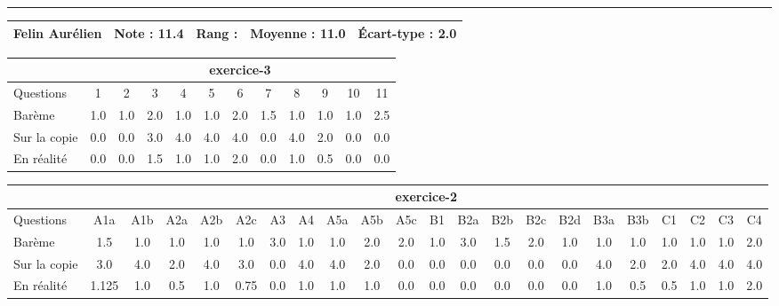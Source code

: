\documentclass[a4paper, landscape, 10pt]{article}
\begin{document}
  \vspace{0.3cm}
  \hrule
  \vspace{0.3cm}

  \begin{minipage}{\textwidth}
    { \bf
    \begin{tabular}{|c|*{4}{c|}}
    \hline
      Felin Aurélien & Note : 11.4 & Rang :  & Moyenne : 11.0 & \'Ecart-type : 2.0 \\
    \hline
    \end{tabular}
    }
    
      \begin{tabular}{|l|*{ 11 }{c|}}
        \hline
        & \multicolumn{ 11 }{c|}{ exercice-3 } \\
        \hline
        Questions & 1&2&3&4&5&6&7&8&9&10&11 \\
        \hline
        Barème & 1.0&1.0&2.0&1.0&1.0&2.0&1.5&1.0&1.0&1.0&2.5 \\
        \hline
        Sur la copie & 0.0&0.0&3.0&4.0&4.0&4.0&0.0&4.0&2.0&0.0&0.0 \\
        \hline
        En réalité & 0.0&0.0&1.5&1.0&1.0&2.0&0.0&1.0&0.5&0.0&0.0 \\
        \hline
      \end{tabular}
    
      \begin{tabular}{|l|*{ 21 }{c|}}
        \hline
        & \multicolumn{ 21 }{c|}{ exercice-2 } \\
        \hline
        Questions & A1a&A1b&A2a&A2b&A2c&A3&A4&A5a&A5b&A5c&B1&B2a&B2b&B2c&B2d&B3a&B3b&C1&C2&C3&C4 \\
        \hline
        Barème & 1.5&1.0&1.0&1.0&1.0&3.0&1.0&1.0&2.0&2.0&1.0&3.0&1.5&2.0&1.0&1.0&1.0&1.0&1.0&1.0&2.0 \\
        \hline
        Sur la copie & 3.0&4.0&2.0&4.0&3.0&0.0&4.0&4.0&2.0&0.0&0.0&0.0&0.0&0.0&0.0&4.0&2.0&2.0&4.0&4.0&4.0 \\
        \hline
        En réalité & 1.125&1.0&0.5&1.0&0.75&0.0&1.0&1.0&1.0&0.0&0.0&0.0&0.0&0.0&0.0&1.0&0.5&0.5&1.0&1.0&2.0 \\
        \hline
      \end{tabular}
    

\end{minipage}
\end{document}
